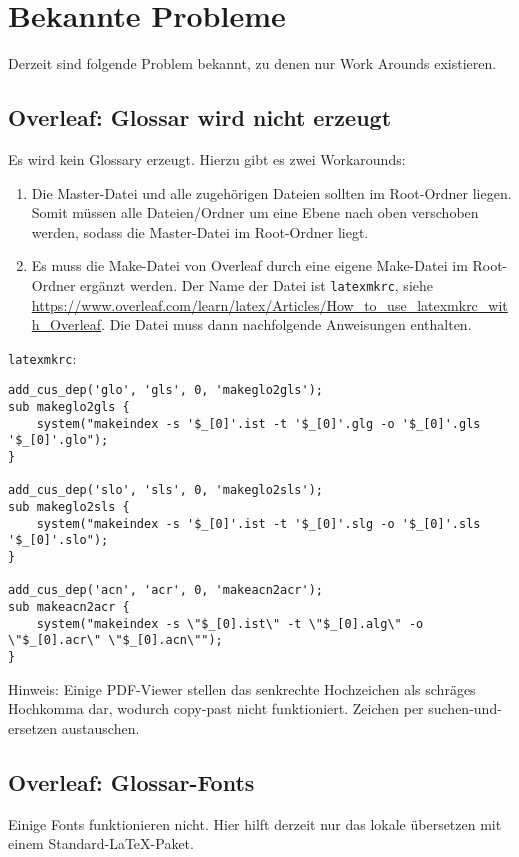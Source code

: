 %
\section{Bekannte Probleme}\label{sec:knownissues}
Derzeit sind folgende Problem bekannt, zu denen nur Work Arounds existieren.

\subsection{Overleaf: Glossar wird nicht erzeugt }\label{sec:knownissues:overleaf_glossary}
Es wird kein Glossary erzeugt. Hierzu gibt es zwei Workarounds:
\begin{enumerate} 
	\item Die Master-Datei und alle zugehörigen Dateien sollten im Root-Ordner liegen. Somit müssen alle Dateien/Ordner um eine Ebene nach oben verschoben werden, sodass die Master-Datei im Root-Ordner liegt.
    \item Es muss die Make-Datei von Overleaf durch eine eigene Make-Datei im Root-Ordner ergänzt werden. Der Name der Datei ist \texttt{latexmkrc}, siehe \url{https://www.overleaf.com/learn/latex/Articles/How_to_use_latexmkrc_with_Overleaf}. Die Datei muss dann nachfolgende Anweisungen enthalten.
\end{enumerate}
    
\texttt{latexmkrc}:
\footnotesize{
\begin{verbatim} 
add_cus_dep('glo', 'gls', 0, 'makeglo2gls');
sub makeglo2gls {
    system("makeindex -s '$_[0]'.ist -t '$_[0]'.glg -o '$_[0]'.gls '$_[0]'.glo");
}

add_cus_dep('slo', 'sls', 0, 'makeglo2sls');
sub makeglo2sls {
    system("makeindex -s '$_[0]'.ist -t '$_[0]'.slg -o '$_[0]'.sls '$_[0]'.slo");
}

add_cus_dep('acn', 'acr', 0, 'makeacn2acr');
sub makeacn2acr {
    system("makeindex -s \"$_[0].ist\" -t \"$_[0].alg\" -o \"$_[0].acr\" \"$_[0].acn\"");
}
\end{verbatim}
}

Hinweis: Einige PDF-Viewer stellen das senkrechte Hochzeichen als schräges Hochkomma dar, wodurch copy-past nicht funktioniert. Zeichen per suchen-und-ersetzen austauschen.

\subsection{Overleaf: Glossar-Fonts}
Einige Fonts funktionieren nicht. Hier hilft derzeit nur das lokale übersetzen mit einem Standard-LaTeX-Paket.


